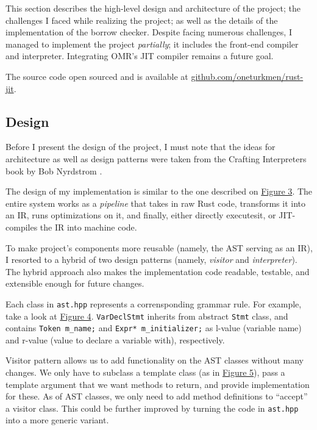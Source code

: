 
This section describes the high-level design and architecture of the project;
the challenges I faced while realizing the project; as well as
the details of the implementation of the borrow checker.
Despite facing numerous challenges, I managed to implement the project
\textit{partially}; it includes the front-end compiler and interpreter.
Integrating OMR's JIT compiler remains a future goal.

The source code open sourced and is available at \href{https://github.com/oneturkmen/rust-jit}{github.com/oneturkmen/rust-jit}.


\subsection{Design}

Before I present the design of the project, I must note that
the ideas for architecture as well as design patterns
were taken from the Crafting Interpreters book by Bob Nyrdstrom
\cite{interpreters}.

The design of my implementation is similar to the one described
on \hyperref[arch1]{Figure 3}. The entire system works as a \textit{pipeline}
that takes in raw Rust code, transforms it into an IR, runs optimizations on it,
and finally, either directly executesit, or JIT-compiles the IR into machine code.

To make project's components more reusable (namely, the AST serving as an IR),
I resorted to a hybrid of two design patterns (namely, \textit{visitor} and
\textit{interpreter}). The hybrid approach also makes the implementation code
readable, testable, and extensible enough for future changes.

Each class in \texttt{ast.hpp} represents a corrensponding grammar rule. For
example, take a look at \hyperref[cpp1]{Figure 4}. \texttt{VarDeclStmt}
inherits from abstract \texttt{Stmt} class, and contains \texttt{Token m\_name;}
and \texttt{Expr* m\_initializer;} as l-value (variable name) and
r-value (value to declare a variable with), respectively.

Visitor pattern allows us to add functionality on the AST classes
without many changes. We only have to subclass a template class (as in
\hyperref[cpp2]{Figure 5}), pass a template argument that we want methods
to return, and provide implementation for these. As of AST classes,
we only need to add method definitions to ``accept'' a visitor
class. This could be further improved by turning the code in \texttt{ast.hpp}
into a more generic variant.

